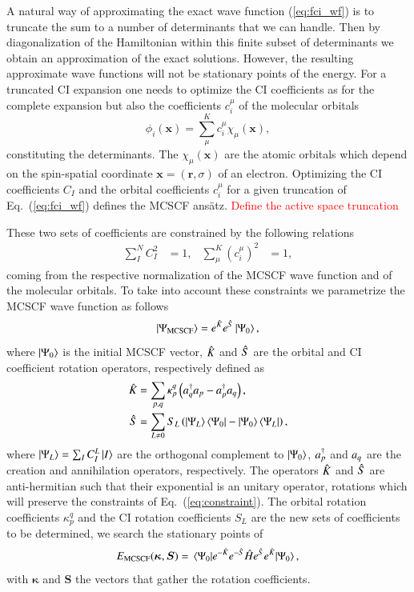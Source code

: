 \documentclass[aps,prb,reprint,showkeys,superscriptaddress]{revtex4-1}
\newcommand{\todo}[1]{\textcolor{red}{#1}}
\begin{document}
A natural way of approximating the exact wave function (\ref{eq:fci_wf}) is to truncate the sum to a number of determinants that we can handle. Then by diagonalization of the Hamiltonian within this finite subset of determinants we obtain an approximation of the exact solutions.
However, the resulting approximate wave functions will not be stationary points of the energy.
For a truncated CI expansion one needs to optimize the CI coefficients as for the complete expansion but also the coefficients $c_i^\mu$ of the molecular orbitals
\begin{equation}
  \label{eq:mo}
  \phi_i(\bm{x}) = \sum^K_\mu c_i^\mu \chi_{\mu}(\bm{x}),
\end{equation}
constituting the determinants. The $\chi_{\mu}(\bm{x})$ are the atomic orbitals which depend on the spin-spatial coordinate $\bm{x} = (\bm{r},\sigma)$ of an electron.
Optimizing the CI coefficients $C_I$ and the orbital coefficients $c_i^\mu$ for a given truncation of Eq.~(\ref{eq:fci_wf}) defines the MCSCF ans\"atz.
\todo{Define the active space truncation}

These two sets of coefficients are constrained by the following relations
\begin{align}
  \label{eq:constraint}
  \sum_I^N C^2_I &= 1, & \sum^K_\mu (c_i^\mu)^2 &= 1,
\end{align}
coming from the respective normalization of the MCSCF wave function and of the molecular orbitals.
To take into account these constraints we parametrize the MCSCF wave function as follows
\begin{equation}
  \label{eq:mcscf_wf}
  \ket{\Psi_{\text{MCSCF}}}=e^{\Hat{K}}e^{\Hat{S}}\ket{\Psi_0},
\end{equation}
where $\ket{\Psi_0}$ is the initial MCSCF vector, $\Hat{K}$ and $\Hat{S}$ are the orbital and CI coefficient rotation operators, respectively defined as
\begin{align}
  \Hat{K} &= \sum_{p,q} \kappa_p^q \left( a_{q}^\dagger a_{p} - a_{p}^\dagger a_{q} \right),  \\
  \Hat{S} &= \sum_{L \neq 0} S_{L}\left(\ket{\Psi_L}\bra{\Psi_0}-\ket{\Psi_0}\bra{\Psi_L}\right),
\end{align}
where $\ket{\Psi_{L}} = \sum_I C_I^L\ket{I} $ are the orthogonal complement to $\ket{\Psi_0}$, $a_{p}^\dagger$ and $a_{q}$ are the creation and annihilation operators, respectively.
The operators $\Hat{K}$ and $\Hat{S}$ are anti-hermitian such that their exponential is an unitary operator, \ie rotations which will preserve the constraints of Eq.~(\ref{eq:constraint}).
The orbital rotation coefficients $\kappa_p^q$ and the CI rotation coefficients $S_{L}$ are the new sets of coefficients to be determined, \ie we search the stationary points of
\begin{equation}
  \label{eq:mcscf_nrj}
  E_{\text{MCSCF}}(\bm{\kappa},\bm{S}) = \mel{\Psi_0}{e^{-\Hat{K}}e^{-\Hat{S}} \Hat{H}e^{\Hat{S}}e^{\Hat{K}}}{\Psi_0},
\end{equation}
with $\bm{\kappa}$ and $\bm{S}$ the vectors that gather the rotation coefficients.
\end{document}

